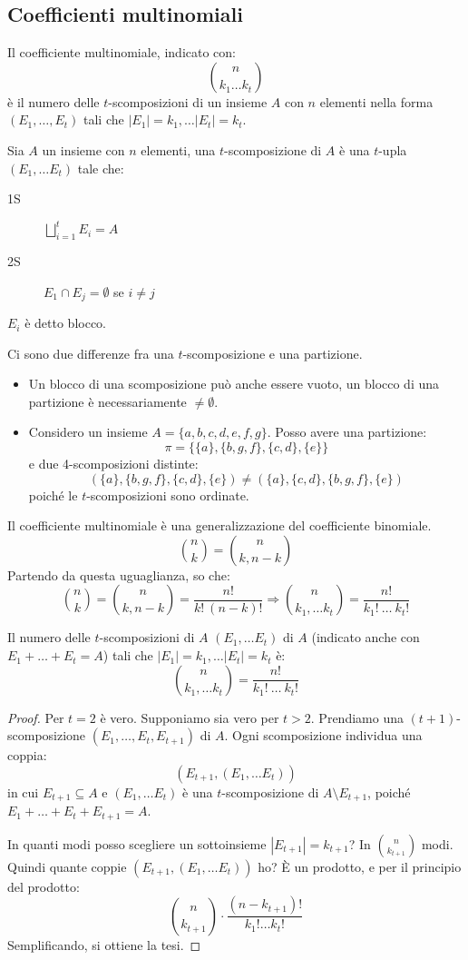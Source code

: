 \subsection{Coefficienti multinomiali}

Il coefficiente multinomiale, indicato con:
\[
\binom{n}{k_1 \dots k_t}
\]
\`e il numero delle $t$-scomposizioni di un insieme $A$ con $n$ elementi nella forma $(E_1, \dots, E_t)$ tali che $|E_1| = k_1, \dots |E_t| = k_t$.

\begin{defn}[$t$-scomposizioni]
Sia $A$ un insieme con $n$ elementi, una $t$-scomposizione di $A$ \`e una $t$-upla $(E_1, \dots E_t)$ tale che:
\begin{description}
  \item[1S] $\bigsqcup_{i = 1}^{t} E_i = A$
  \item[2S] $E_1 \cap E_j = \emptyset$ se $i \neq j$ 
\end{description}
$E_i$ \`e detto blocco.
\end{defn}
Ci sono due differenze fra una $t$-scomposizione e una partizione.
\begin{itemize}
  \item Un blocco di una scomposizione pu\`o anche essere vuoto, un blocco di una partizione \`e necessariamente $\neq \emptyset$.
  \item Considero un insieme $A = \{ a, b, c, d, e, f, g\}$. Posso avere una partizione:
  \[
  \pi = \{ \{a\}, \{b, g, f\}, \{c, d\}, \{e\} \}
  \]
  e due 4-scomposizioni distinte:
  \[
  (\{a\}, \{b, g, f\}, \{c, d\}, \{e\}) \neq 
  (\{a\}, \{c, d\}, \{b, g, f\}, \{e\})
  \]
  poich\'e le $t$-scomposizioni sono ordinate.
\end{itemize} 

Il coefficiente multinomiale \`e una generalizzazione del coefficiente binomiale.
\[
\binom{n}{k} = \binom{n}{k, n-k}
\]
Partendo da questa uguaglianza, so che:
\[
\binom{n}{k} = \binom{n}{k, n-k} = \frac{n!}{k! \ (n - k)!}
\Rightarrow
\binom{n}{k_1, \dots k_t} = \frac{n!}{k_1! \ \dots \ k_t!}
\]

\begin{prop}
Il numero delle $t$-scomposizioni di $A$ $(E_1, \dots E_t)$ di $A$ (indicato anche con $E_1 + \dots + E_t = A$) tali che $|E_1| = k_1, \dots |E_t| = k_t$ \`e:
\[
\binom{n}{k_1, \dots k_t} = \frac{n!}{k_1! \ \dots \ k_t!}
\]
\end{prop}
\begin{proof}
Per $t = 2$ \`e vero. Supponiamo sia vero per $t > 2$. Prendiamo una $(t+1)$-scomposizione $(E_1, \dots, E_t, E_{t+1})$ di $A$. Ogni scomposizione individua una coppia:
\[
\left( E_{t+1}, (E_1, \dots E_t) \right)
\]
in cui $E_{t+1} \subseteq A$ e $(E_1, \dots E_t)$ \`e una $t$-scomposizione di $A \setminus E_{t+1}$, poich\'e $E_1 + \dots + E_t + E_{t+1} = A$.

In quanti modi posso scegliere un sottoinsieme $|E_{t+1}| = k_{t+1}$? In $\binom{n}{k_{t+1}}$ modi. Quindi quante coppie $(E_{t+1}, (E_1, \dots E_t))$ ho? \`E un prodotto, e per il principio del prodotto:
\[
\binom{n}{k_{t+1}} \cdot \frac{(n - k_{t+1})!}{k_1! \dots k_{t}!}
\]
Semplificando, si ottiene la tesi.
\end{proof}

